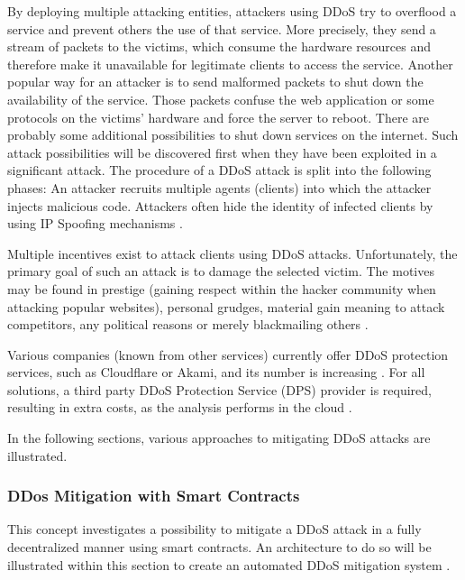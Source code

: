 By deploying multiple attacking entities, attackers using DDoS try to overflood a service and prevent others the use of that service. More precisely, they send a stream of packets to the victims, which consume the hardware resources and therefore make it unavailable for legitimate clients to access the service. Another popular way for an attacker is to send malformed packets to shut down the availability of the service. Those packets confuse the web application or some protocols on the victims' hardware and force the server to reboot. There are probably some additional possibilities to shut down services on the internet. Such attack possibilities will be discovered first when they have been exploited in a significant attack. The procedure of a DDoS attack is split into the following phases: An attacker recruits multiple agents (clients) into which the attacker injects malicious code. Attackers often hide the identity of infected clients by using IP Spoofing mechanisms \cite{Mirkovic2004}.


Multiple incentives exist to attack clients using DDoS attacks. Unfortunately, the primary goal of such an attack is to damage the selected victim. The motives may be found in prestige (gaining respect within the hacker community when attacking popular websites), personal grudges, material gain meaning to attack competitors, any political reasons or merely blackmailing others \cite{Mirkovic2004}.


Various companies (known from other services) currently offer DDoS protection services, such as Cloudflare or Akami, and its number is increasing \cite{Pras2016}. For all solutions, a third party DDoS Protection Service (DPS) provider is required, resulting in extra costs, as the analysis performs in the cloud \cite{Rodrigues2017}.


In the following sections, various approaches to mitigating DDoS attacks are illustrated.


\subsubsection{DDos Mitigation with Smart Contracts}
This concept investigates a possibility to mitigate a DDoS attack in a fully decentralized manner using smart contracts. An architecture to do so will be illustrated within this section to create an automated DDoS mitigation system \cite{Rodrigues2017}.


